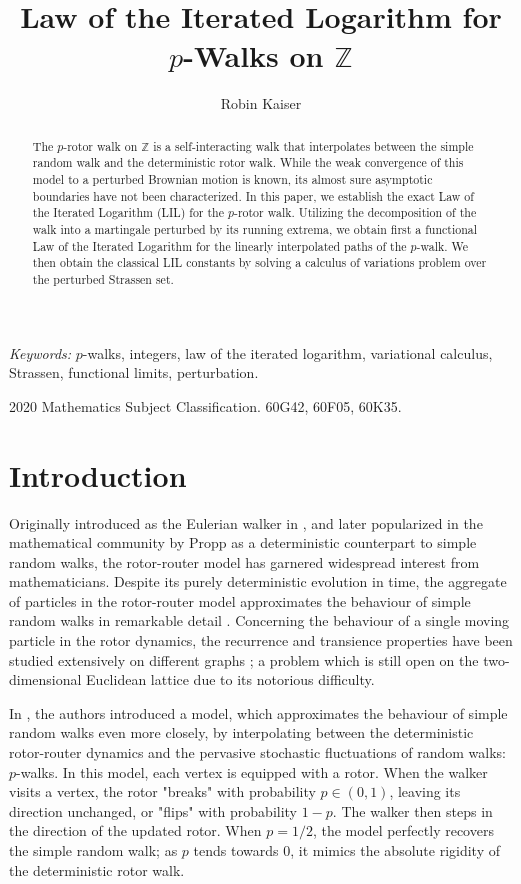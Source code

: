 \documentclass[11pt]{article}
\title{Law of the  Iterated Logarithm for $p$-Walks on $\mathbb{Z}$}
\author{Robin Kaiser}
\date{}
\theoremstyle{remark}
\begin{document}
\maketitle
\begin{abstract}
    The $p$-rotor walk on $\mathbb{Z}$ is a self-interacting walk that interpolates between the simple random walk and the deterministic rotor walk. While the weak convergence of this model to a perturbed Brownian motion is known, its almost sure asymptotic boundaries have not been characterized. In this paper, we establish the exact Law of the Iterated Logarithm (LIL) for the $p$-rotor walk. Utilizing the decomposition of the walk into a martingale perturbed by its running extrema, we obtain first a functional Law of the Iterated Logarithm for the linearly interpolated paths of the $p$-walk. We then obtain the classical LIL constants by solving a calculus of variations problem over the perturbed Strassen set.
\end{abstract}

{\it Keywords:} $p$-walks, integers, law of the iterated logarithm, variational calculus, Strassen, functional limits, perturbation.

{2020 Mathematics Subject Classification.} 60G42, 60F05, 60K35.

\section{Introduction}
Originally introduced as the Eulerian walker in \cite{PDDK96}, and later popularized in the mathematical community by Propp \cite{P03} as a deterministic counterpart to simple random walks, the rotor-router model has garnered widespread interest from mathematicians. Despite its purely deterministic evolution in time, the aggregate of particles in the rotor-router model approximates the behaviour of simple random walks in remarkable detail \cite{CS06,HP10,LP08,LP09}. Concerning the behaviour of a single moving particle in the rotor dynamics, the recurrence and transience properties have been studied extensively on different graphs \cite{AH12,FLP16,HSH20,HMSH15,KSH24,AH11}; a problem which is still open on the two-dimensional Euclidean lattice due to its notorious difficulty.

In \cite{HLSH18}, the authors introduced a model, which approximates the behaviour of simple random walks even more closely, by interpolating between the deterministic rotor-router dynamics and the pervasive stochastic fluctuations of random walks: $p$-walks.  In this model, each vertex is equipped with a rotor. When the walker visits a vertex, the rotor "breaks" with probability $p \in (0,1)$, leaving its direction unchanged, or "flips" with probability $1-p$. The walker then steps in the direction of the updated rotor. When $p = 1/2$, the model perfectly recovers the simple random walk; as $p$ tends towards $0$, it mimics the absolute rigidity of the deterministic rotor walk.
\end{document}
